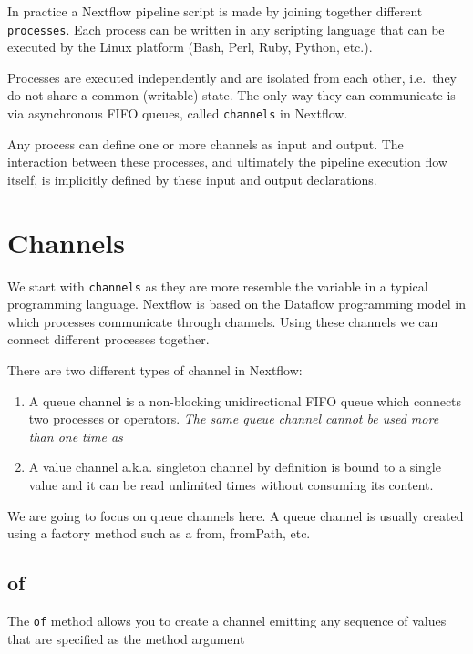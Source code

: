 \documentclass[
]{book}
\providecommand{\tightlist}{%
  \setlength{\itemsep}{0pt}\setlength{\parskip}{0pt}}
\begin{document}
In practice a Nextflow pipeline script is made by joining together different \texttt{processes}. Each process can be written in any scripting language that can be executed by the Linux platform (Bash, Perl, Ruby, Python, etc.).

Processes are executed independently and are isolated from each other, i.e.~they do not share a common (writable) state. The only way they can communicate is via asynchronous FIFO queues, called \texttt{channels} in Nextflow.

Any process can define one or more channels as input and output. The interaction between these processes, and ultimately the pipeline execution flow itself, is implicitly defined by these input and output declarations.

\hypertarget{channels}{%
\chapter{Channels}\label{channels}}

We start with \texttt{channels} as they are more resemble the variable in a typical programming language. Nextflow is based on the Dataflow programming model in which processes communicate through channels. Using these channels we can connect different processes together.

There are two different types of channel in Nextflow:

\begin{enumerate}
\def\labelenumi{\arabic{enumi}.}
\tightlist
\item
  A queue channel is a non-blocking unidirectional FIFO queue which connects two processes or operators. \emph{The same queue channel cannot be used more than one time as}
\item
  A value channel a.k.a. singleton channel by definition is bound to a single value and it can be read unlimited times without consuming its content.
\end{enumerate}

We are going to focus on queue channels here. A queue channel is usually created using a factory method such as a from, fromPath, etc.

\hypertarget{of}{%
\section{of}\label{of}}

The \texttt{of} method allows you to create a channel emitting any sequence of values that are specified as the method argument
\end{document}
